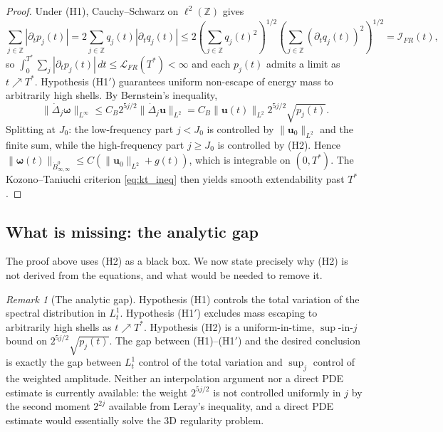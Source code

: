\documentclass[11pt,a4paper]{article}
\theoremstyle{definition}
\theoremstyle{remark}
\newtheorem{remark}[theorem]{Remark}
\begin{document}
\begin{proof}
Under (H1), Cauchy--Schwarz on $\ell^2(\mathbb{Z})$ gives
\[
\sum_{j \in \mathbb{Z}} |\partial_t p_j(t)| = 2 \sum_{j \in \mathbb{Z}} q_j(t) |\partial_t q_j(t)| \le 2 \left(\sum_{j\in\mathbb{Z}} q_j(t)^2\right)^{1/2} \left(\sum_{j\in\mathbb{Z}} (\partial_t q_j(t))^2\right)^{1/2} = \mathcal{I}_{FR}(t),
\]
so $\int_0^{T^*} \sum_j |\partial_t p_j(t)|\,dt \le \mathcal{L}_{FR}(T^*) < \infty$ and each $p_j(t)$ admits a limit as $t \nearrow T^*$. Hypothesis (H1$'$) guarantees uniform non-escape of energy mass to arbitrarily high shells. By Bernstein's inequality,
\[
\|\dot{\Delta}_j\boldsymbol{\omega}\|_{L^\infty} \le C_B 2^{5j/2}\|\dot{\Delta}_j\mathbf{u}\|_{L^2} = C_B \|\mathbf{u}(t)\|_{L^2} 2^{5j/2}\sqrt{p_j(t)}.
\]
Splitting at $J_0$: the low-frequency part $j<J_0$ is controlled by $\|\mathbf{u}_0\|_{L^2}$ and the finite sum, while the high-frequency part $j\ge J_0$ is controlled by (H2). Hence $\|\boldsymbol{\omega}(t)\|_{\dot{B}^0_{\infty,\infty}} \le C(\|\mathbf{u}_0\|_{L^2} + g(t))$, which is integrable on $(0,T^*)$. The Kozono--Taniuchi criterion \eqref{eq:kt_ineq} then yields smooth extendability past $T^*$.
\end{proof}

\subsection{What is missing: the analytic gap}

The proof above uses (H2) as a black box. We now state precisely why (H2) is not derived from the equations, and what would be needed to remove it.

\begin{remark}[The analytic gap]
\label{rem:gap}
Hypothesis (H1) controls the total variation of the spectral distribution in $L^1_t$. Hypothesis (H1$'$) excludes mass escaping to arbitrarily high shells as $t \nearrow T^*$. Hypothesis (H2) is a uniform-in-time, $\sup$-in-$j$ bound on $2^{5j/2}\sqrt{p_j(t)}$. The gap between (H1)--(H1$'$) and the desired conclusion is exactly the gap between $L^1_t$ control of the total variation and $\sup_j$ control of the weighted amplitude. Neither an interpolation argument nor a direct PDE estimate is currently available: the weight $2^{5j/2}$ is not controlled uniformly in $j$ by the second moment $2^{2j}$ available from Leray's inequality, and a direct PDE estimate would essentially solve the 3D regularity problem.
\end{remark}
\end{document}
